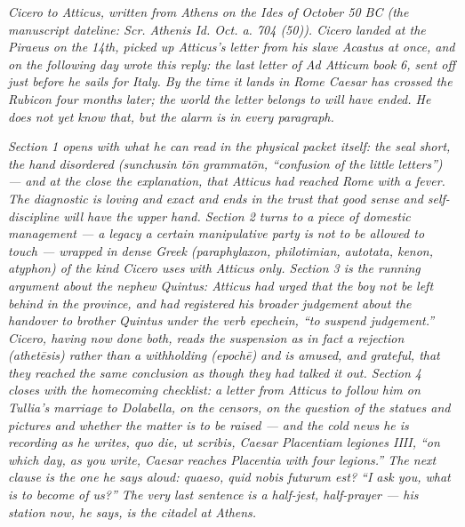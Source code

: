 
\textit{Cicero to Atticus, written from Athens on the
Ides of October 50 BC (the manuscript dateline:
\textit{Scr. Athenis Id. Oct. a. 704 (50)}). Cicero
landed at the Piraeus on the 14th, picked up Atticus's
letter from his slave Acastus at once, and on the
following day wrote this reply: the last letter of
\textit{Ad Atticum} book 6, sent off just before he
sails for Italy. By the time it lands in Rome Caesar
has crossed the Rubicon four months later; the world the
letter belongs to will have ended. He does not yet know
that, but the alarm is in every paragraph.}

\textit{Section 1 opens with what he can read in the
physical packet itself: the seal short, the hand
disordered (\textit{sunchusin tōn grammatōn},
``confusion of the little letters'') --- and at the
close the explanation, that Atticus had reached Rome
with a fever. The diagnostic is loving and exact and
ends in the trust that good sense and self-discipline
will have the upper hand. Section 2 turns to a piece
of domestic management --- a legacy a certain
manipulative party is not to be allowed to touch ---
wrapped in dense Greek (\emph{paraphylaxon},
\emph{philotimian}, \emph{autotata}, \emph{kenon},
\emph{atyphon}) of the kind Cicero uses with Atticus
only. Section 3 is the running argument about the
nephew Quintus: Atticus had urged that the boy not be
left behind in the province, and had registered his
broader judgement about the handover to brother Quintus
under the verb \emph{epechein}, ``to suspend judgement.''
Cicero, having now done both, reads the suspension as
in fact a rejection (\emph{athetēsis}) rather than a
withholding (\emph{epochē}) and is amused, and grateful,
that they reached the same conclusion as though they
had talked it out. Section 4 closes with the homecoming
checklist: a letter from Atticus to follow him on Tullia's
marriage to Dolabella, on the censors, on the question
of the statues and pictures and whether the matter is to
be raised --- and the cold news he is recording as he
writes, \textit{quo die, ut scribis, Caesar Placentiam
legiones IIII}, ``on which day, as you write, Caesar
reaches Placentia with four legions.'' The next clause
is the one he says aloud: \textit{quaeso, quid nobis
futurum est?} ``I ask you, what is to become of us?''
The very last sentence is a half-jest, half-prayer ---
his station now, he says, is the citadel at Athens.}
